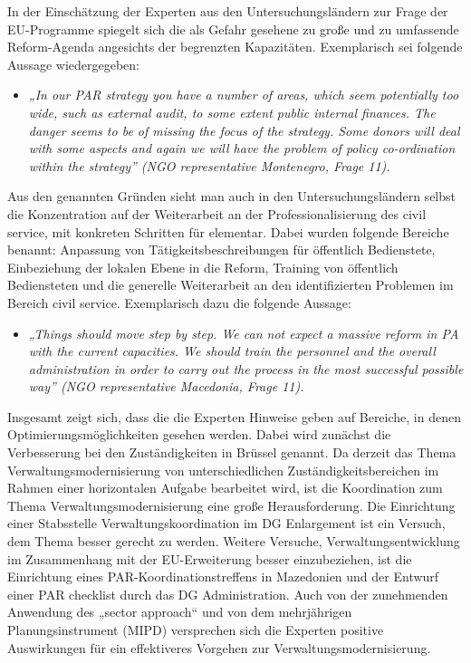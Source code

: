 In der Einschätzung der Experten aus den Untersuchungsländern zur Frage der EU-Programme spiegelt sich die als Gefahr gesehene zu große und zu umfassende Reform-Agenda angesichts der begrenzten Kapazitäten. Exemplarisch sei folgende Aussage wiedergegeben:
\begin{itemize}[label={}]
\item \textit{„In our PAR strategy you have a number of areas, which seem potentially too wide, such as external audit, to some extent public internal finances. The danger seems to be of missing the focus of the strategy. Some donors will deal with some aspects and again we will have the problem of policy co-ordination within the strategy” (NGO representative Montenegro, Frage 11).}
\end{itemize}
Aus den genannten Gründen sieht man auch in den Untersuchungsländern selbst die Konzentration auf der Weiterarbeit an der Professionalisierung des civil service, mit konkreten Schritten für elementar. Dabei wurden folgende Bereiche benannt: Anpassung von Tätigkeitsbeschreibungen für öffentlich Bedienstete, Einbeziehung der lokalen Ebene in die Reform, Training von öffentlich Bediensteten und die generelle Weiterarbeit an den identifizierten Problemen im Bereich civil service. Exemplarisch dazu die folgende Aussage:
\begin{itemize}[label={}]
\item \textit{„Things should move step by step. We can not expect a massive reform in PA with the current capacities. We should train the personnel and the overall administration in order to carry out the process in the most successful possible way” (NGO representative Macedonia, Frage 11).}
\end{itemize}
Insgesamt zeigt sich, dass die die Experten Hinweise geben auf Bereiche, in denen Optimierungsmöglichkeiten gesehen werden. Dabei wird zunächst die Verbesserung bei den Zuständigkeiten in Brüssel genannt. Da derzeit das Thema Verwaltungsmodernisierung von unterschiedlichen Zuständigkeitsbereichen im Rahmen einer horizontalen Aufgabe bearbeitet wird, ist die Koordination zum Thema Verwaltungsmodernisierung eine große Herausforderung. Die Einrichtung einer Stabsstelle Verwaltungskoordination im DG Enlargement ist ein Versuch, dem Thema besser gerecht zu werden. Weitere Versuche, Verwaltungsentwicklung im Zusammenhang mit der EU-Erweiterung besser einzubeziehen, ist die Einrichtung eines PAR-Koordinationstreffens in Mazedonien und der Entwurf einer PAR checklist durch das DG Administration. Auch von der zunehmenden Anwendung des „sector approach“ und von dem mehrjährigen Planungsinstrument (MIPD) versprechen sich die Experten positive Auswirkungen für ein effektiveres Vorgehen zur Verwaltungsmodernisierung.\par
